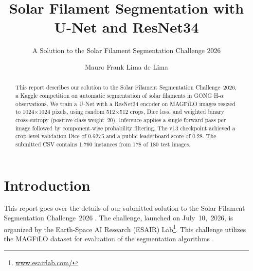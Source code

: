 \documentclass[sigconf]{acmart}
\begin{document}
\author{Mauro Frank Lima de Lima}

\title{Solar Filament Segmentation with U-Net and ResNet34}
\subtitle{A Solution to the Solar Filament Segmentation Challenge 2026}

\begin{abstract}
This report describes our solution to the Solar Filament Segmentation Challenge~2026, a Kaggle competition on automatic segmentation of solar filaments in GONG H-$\alpha$ observations.
We train a U-Net with a ResNet34 encoder on MAGFiLO images resized to 1024$\times$1024 pixels, using random 512$\times$512 crops, Dice loss, and weighted binary cross-entropy (positive class weight~20). Inference applies a single forward pass per image followed by component-wise probability filtering. The v13 checkpoint achieved a crop-level validation Dice of 0.6275 and a public leaderboard score of 0.28. The submitted CSV contains 1,790 instances from 178 of 180 test images.
\end{abstract}


\maketitle

\section{Introduction}

This report goes over the details of our submitted solution to the Solar Filament Segmentation Challenge~2026 \cite{filament-segmentation-2026}. The challenge, launched on July~10,~2026, is organized by the Earth-Space AI Research (ESAIR) Lab\footnote{\href{https://www.esairlab.com/home}{www.esairlab.com/}}. This challenge utilizes the MAGFiLO dataset for evaluation of the segmentation algorithms \cite{ahmadzadeh2024dataset}.
\end{document}
